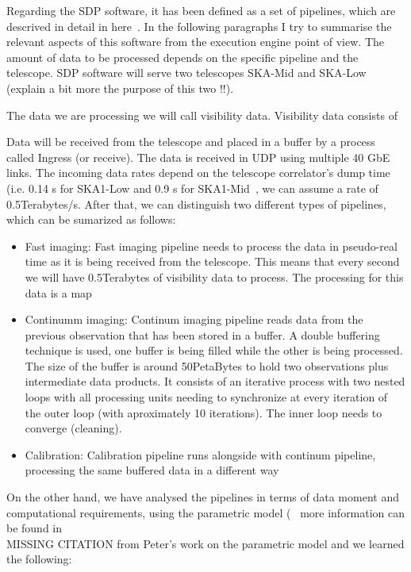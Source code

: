 \documentclass[11pt,a4paper]{article}
\begin{document}
Regarding the SDP software, it has been defined as a set of pipelines, which are descrived in detail in here~\cite{SDPpipelines}.
In the following paragraphs I try to summarise the relevant aspects of this software from the execution engine point of view.
The amount of data to be processed depends on the specific pipeline and the telescope. 
SDP software will serve two telescopes SKA-Mid and SKA-Low (explain a bit more the purpose of this two !!). 

The data we are processing we will call visibility data. Visibility data consists of 

Data will be received from the telescope and placed in a buffer by a process called Ingress (or receive). The data is received in UDP using multiple 
40 GbE links. The incoming data rates depend on the telescope correlator's dump time (i.e. 0.14 s for SKA1-Low and 0.9 s for SKA1-Mid~\cite{ParametricModel}, we can assume a rate of 0.5Terabytes/s. After that, we can distinguish two different types of pipelines, which can be 
sumarized as follows:
\begin{itemize}
\item Fast imaging: Fast imaging pipeline needs to process the data in pseudo-real time as it is being received from the telescope.
 This means that every second we will have 0.5Terabytes of visibility data to process. The processing for this data is a map
\item Continumm imaging: Continum imaging pipeline reads data from the previous observation that has been stored in a buffer.
A double buffering technique is used, one buffer is being filled while the other is being processed. The size of the buffer is around 50PetaBytes
to hold two observations plus intermediate data products. It consists of an iterative process with two nested loops with all processing units needing
to synchronize at every iteration of the outer loop (with aproximately 10 iterations). The inner loop needs to converge (cleaning).
\item Calibration: Calibration pipeline runs alongside with continum pipeline, processing the same buffered data in a different way
\end{itemize}


On the other hand, we have analysed the pipelines in terms of data moment and computational requirements, using 
the parametric model (~\cite{SDPparametricmodel} more information
can be found in \\ MISSING CITATION from Peter's work on the parametric model
and we learned the following: 
\end{document}
